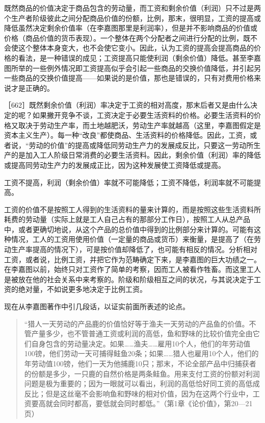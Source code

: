 既然商品的价值决定于商品包含的劳动量，而工资和剩余价值（利润）只不过是两个生产者阶级彼此之间分配商品价值的份额，比例，那末，很明显，工资的提高或降低虽然决定剩余价值率（在李嘉图那里是利润率），但是并不影响商品的价值或价格（商品价值的货币表现）。一个整体在两个分配者之间进行分配的比例，既不会使这个整体本身变大，也不会使它变小。因此，认为工资的提高会提高商品的价格的看法，是一种错误的成见；工资提高只能使利润（剩余价值）降低。甚至李嘉图所举的一些例外情况即工资提高似乎会引起一些商品的交换价值降低，并引起另一些商品的交换价值提高——如果说的是价值，那也是错误的，只有对费用价格来说才是正确的。

［662］既然剩余价值（利润）率决定于工资的相对高度，那末后者又是由什么决定的呢？如果撇开竞争不谈，工资决定于必要生活资料的价格。必要生活资料的价格又取决于劳动生产率，而土地越肥沃，劳动生产率就越高（这里，李嘉图假定是资本主义生产）。每一种“改良”都使商品、生活资料的价格降低。因此，工资，或者说，“劳动的价值”的提高或降低同劳动生产力的发展成反比，只要这一劳动所生产的是加入工人阶级日常消费的必要生活资料。因此，剩余价值（利润）率的降低或提高同劳动生产力的发展成正比，因为这种发展使工资降低或提高。

工资不提高，利润（剩余价值）率就不可能降低；工资不降低，利润率就不可能提高。

工资的价值不是按照工人得到的生活资料的量来计算的，而是按照这些生活资料所耗费的劳动量（实际上就是工人自己占有的那部分工作日），按照工人从总产品中，或者更确切地说，从这个产品的总价值中得到的比例部分来计算的。可能有这种情况，工人的工资用使用价值（一定量的商品或货币）来衡量，是提高了（在劳动生产率提高的情况下），可是按价值却降低了，也可能有相反的情况。分析相对工资，或者说，比例工资，并把它作为范畴确定下来，是李嘉图的巨大功绩之一。在李嘉图以前，始终只对工资作了简单的考察，因而工人被看作牲畜。而这里工人是被放在他的社会关系中来考察的。阶级和阶级相互之间的状况，与其说决定于工资的绝对量，不如说更多地决定于比例工资。

现在从李嘉图著作中引几段话，以证实前面所表述的论点。

\begin{quote}{“猎人一天劳动的产品鹿的价值恰好等于渔夫一天劳动的产品鱼的价值。不管产量多少，也不管普通工资或利润的高低，鱼和野味的比较价值完全由它们自身包含的劳动量决定。如果……渔夫……雇用10个人，他们的年劳动值100镑，他们劳动一天可捕得鲑鱼20条；如果……猎人也雇用10个人，他们的年劳动值100镑，他们一天为他捕鹿10只；那末，不论全部产品中归捕获者的份额是多少，一只鹿的自然价格是两条鲑鱼。用来支付工资的份额对利润问题是极为重要的；因为一眼就可以看出，利润的高低恰好同工资的高低成反比；但是这丝毫不会影响鱼和野味的相对价值，因为在这两个行业中，工资要高就会同时都高，要低就会同时都低。”（第1章《论价值》，第20—21页）}\end{quote}

